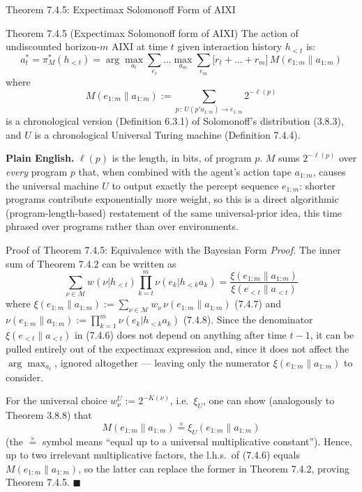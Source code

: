 \documentclass[aspectratio=169,10pt]{beamer}
\newcommand{\Mcal}{\mathcal{M}}
\begin{document}
\begin{frame}{Theorem 7.4.5: Expectimax Solomonoff Form of AIXI}
  \begin{block}{Theorem 7.4.5 (Expectimax Solomonoff form of AIXI)}
    The action of undiscounted horizon-$m$ AIXI at time $t$ given
    interaction history $h_{<t}$ is:
    \[
      a_t^* = \pi_M^*(h_{<t}) = \arg\max_{a_t}\sum_{e_t}\dots\max_{a_m}
      \sum_{e_m}\big[r_t+\dots+r_m\big]\,M(e_{1:m}\|a_{1:m})
    \]
    where
    \[
      M(e_{1:m}\|a_{1:m}) := \sum_{p\,:\,U(p'a_{1:m})\to e_{1:m}} 2^{-\ell(p)}
    \]
    is a chronological version (Definition 6.3.1) of Solomonoff's
    distribution (3.8.3), and $U$ is a chronological Universal Turing
    machine (Definition 7.4.4).
  \end{block}
  \textbf{Plain English.} $\ell(p)$ is the length, in bits, of program $p$.
  $M$ sums $2^{-\ell(p)}$ over \emph{every} program $p$ that, when combined
  with the agent's action tape $a_{1:m}$, causes the universal machine $U$
  to output exactly the percept sequence $e_{1:m}$: shorter programs
  contribute exponentially more weight, so this is a direct algorithmic
  (program-length-based) restatement of the same universal-prior idea, this
  time phrased over programs rather than over environments.
\end{frame}

\begin{frame}{Proof of Theorem 7.4.5: Equivalence with the Bayesian Form}
  \textit{Proof.} The inner sum of Theorem 7.4.2 can be written as
  \[
    \sum_{\nu\in\Mcal} w(\nu|h_{<t})\prod_{k=t}^m\nu(e_k|h_{<k}a_k)
    = \frac{\xi(e_{1:m}\|a_{1:m})}{\xi(e_{<t}\|a_{<t})} \tag{7.4.6}
  \]
  where $\xi(e_{1:m}\|a_{1:m}):=\sum_{\nu\in\Mcal}w_\nu\,\nu(e_{1:m}\|a_{1:m})$
  (7.4.7) and $\nu(e_{1:m}\|a_{1:m}):=\prod_{k=1}^m\nu(e_k|h_{<k}a_k)$
  (7.4.8). Since the denominator $\xi(e_{<t}\|a_{<t})$ in (7.4.6) does not
  depend on anything after time $t{-}1$, it can be pulled entirely out of
  the expectimax expression and, since it does not affect the
  $\arg\max_{a_t}$, ignored altogether --- leaving only the numerator
  $\xi(e_{1:m}\|a_{1:m})$ to consider.

  \vspace{2mm}
  For the universal choice $w_\nu^U:=2^{-K(\nu)}$, i.e.\ $\xi_U$, one can
  show (analogously to Theorem 3.8.8) that
  \[
    M(e_{1:m}\|a_{1:m}) \stackrel{\times}{=} \xi_U(e_{1:m}\|a_{1:m}) \tag{7.4.9}
  \]
  (the $\stackrel{\times}{=}$ symbol means ``equal up to a universal
  multiplicative constant''). Hence, up to two irrelevant multiplicative
  factors, the l.h.s.\ of (7.4.6) equals $M(e_{1:m}\|a_{1:m})$, so the
  latter can replace the former in Theorem 7.4.2, proving Theorem 7.4.5.
  $\blacksquare$
\end{frame}
\end{document}
